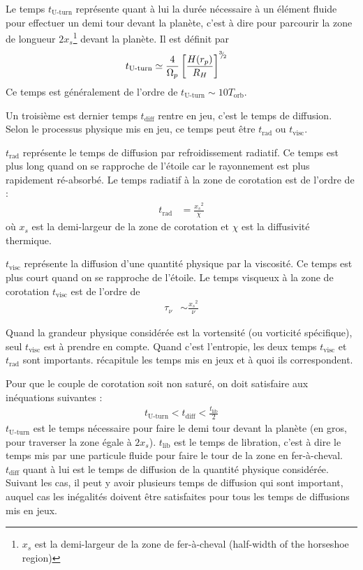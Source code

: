 Le temps $t_\text{U-turn}$ représente quant à lui la durée nécessaire à un élément fluide pour effectuer un demi tour devant la planète, c'est à dire pour parcourir la zone de longueur $2x_s$\footnote{$x_s$ est la demi-largeur de la zone de fer-à-cheval (\og half-width of the horseshoe region\fg)} devant la planète. Il est définit par \citep[eq. (64)]{baruteau2008corotation}
\begin{align}
t_\text{U-turn} &\simeq \frac{4}{\Omega_p}\left[\frac{H(r_p)}{R_H}\right]^{{}^{3\!\!}/ _{\!2}}
\end{align}
Ce temps est généralement de l'ordre de $t_\text{U-turn} \sim 10 T_\text{orb}$. 

Un troisième est dernier temps $t_\text{diff}$ rentre en jeu, c'est le temps de diffusion. Selon le processus physique mis en jeu, ce temps peut être $t_\text{rad}$ ou $t_\text{visc}$.

$t_\text{rad}$ représente le temps de diffusion par refroidissement radiatif. Ce temps est plus long quand on se rapproche de l'étoile car le rayonnement est plus rapidement ré-absorbé. Le temps radiatif à la zone de corotation est de l'ordre de :
\begin{align}
t_\text{rad} &= \frac{{x_s}^2}{\chi}
\end{align}
où $x_s$ est la demi-largeur de la zone de corotation et $\chi$ est la diffusivité thermique.
 
$t_\text{visc}$ représente la diffusion d'une quantité physique par la viscosité. Ce temps est plus court quand on se rapproche de l'étoile. Le temps visqueux à la zone de corotation $t_\text{visc}$ est  de l'ordre de \citep{masset2001coorbital, masset2002coorbital, ogilvie2003saturation}
\begin{align}
\tau_\nu &\sim \frac{{x_s}^2}{\nu}
\end{align}

Quand la grandeur physique considérée est la vortensité (ou vorticité spécifique), seul $t_\text{visc}$ est à prendre en compte. Quand c'est l'entropie, les deux temps $t_\text{visc}$ et $t_\text{rad}$ sont importants.  récapitule les temps mis en jeux et à quoi ils correspondent.

\bigskip

Pour que le couple de corotation soit non saturé, on doit satisfaire aux inéquations suivantes \citep[eq. (31)]{baruteau2013recent} :
\begin{align}
t_\text{U-turn} < t_\text{diff} < \frac{t_\text{lib}}{2}
\end{align}
$t_\text{U-turn}$ est le temps nécessaire pour faire le demi tour devant la planète (en gros, pour traverser la zone égale à $2x_s$). $t_\text{lib}$ est le temps de libration, c'est à dire le temps mis par une particule fluide pour faire le tour de la zone en fer-à-cheval. $t_\text{diff}$ quant à lui est le temps de diffusion de la quantité physique considérée. Suivant les cas, il peut y avoir plusieurs temps de diffusion qui sont important, auquel cas les inégalités doivent être satisfaites pour tous les temps de diffusions mis en jeux.

